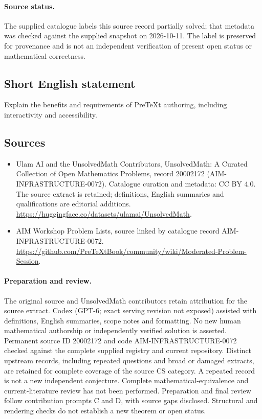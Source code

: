\documentclass[11pt]{article}
\begin{document}
\paragraph{Source status.}
The supplied catalogue labels this source record partially solved; that metadata was checked against the supplied snapshot on 2026-10-11. The label is preserved for provenance and is not an independent verification of present open status or mathematical correctness.
\subsection{Short English statement}
Explain the benefits and requirements of PreTeXt authoring, including interactivity and accessibility.
\subsection{Sources}
\begin{itemize}
\item[\hypertarget{source:20002172:1}{S1}] Ulam AI and the UnsolvedMath Contributors, UnsolvedMath: A Curated Collection of Open Mathematics Problems, record 20002172 (AIM-INFRASTRUCTURE-0072). Catalogue curation and metadata: CC BY 4.0. The source extract is retained; definitions, English summaries and qualifications are editorial additions.
\url{https://huggingface.co/datasets/ulamai/UnsolvedMath}.
\item[\hypertarget{source:20002172:2}{S2}] AIM Workshop Problem Lists, source linked by catalogue record AIM-INFRASTRUCTURE-0072.
\url{https://github.com/PreTeXtBook/community/wiki/Moderated-Problem-Session}.
\end{itemize}
\paragraph{Preparation and review.}
The original source and UnsolvedMath contributors retain attribution for the source extract. Codex (GPT-6; exact serving revision not exposed) assisted with definitions, English summaries, scope notes and formatting. No new human mathematical authorship or independently verified solution is asserted. Permanent source ID 20002172 and code AIM-INFRASTRUCTURE-0072 checked against the complete supplied registry and current repository. Distinct upstream records, including repeated questions and broad or damaged extracts, are retained for complete coverage of the source CS category. A repeated record is not a new independent conjecture. Complete mathematical-equivalence and current-literature review has not been performed. Preparation and final review follow contribution prompts C and D, with source gaps disclosed. Structural and rendering checks do not establish a new theorem or open status.
\label{end:20002172}
\end{document}
